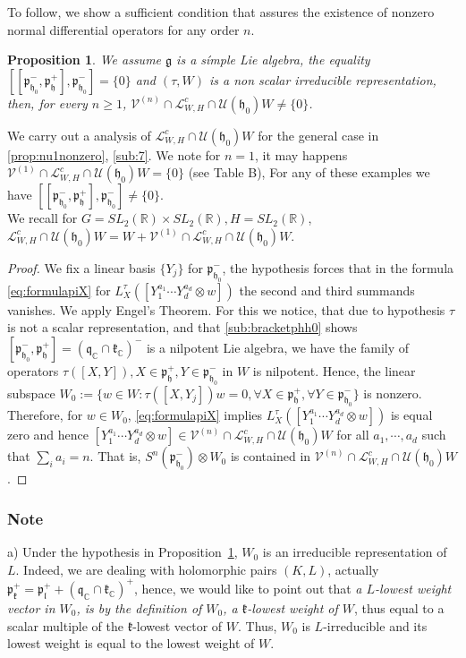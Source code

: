 \documentclass[12pt]{amsart}
\newtheorem{prop}[thm]{Proposition}
\theoremstyle{definition}
\theoremstyle{remark}
\newcommand{\g}{\mathfrak{g}}
\newcommand{\h}{\mathfrak{h}}
\renewcommand{\k}{{\mathfrak k}}
\renewcommand{\l}{\mathfrak l}
\newcommand{\p}{\mathfrak p}
\newcommand{\q}{\mathfrak q}
\newcommand{\C}{{\mathbb C}}
\newcommand{\R}{{\mathbb R}}
\numberwithin{equation}{section}
\begin{document}
 To follow, we show a sufficient condition that assures the existence of nonzero normal differential operators for   any order $n$.
\begin{prop}\label{prop:exisnormal} We assume $\g$ is a símple Lie algebra,  the equality $[[\p_{\h_0}^-, \p_\h^+],\p_{\h_0}^- ]=\{0\}$ and  $(\tau,W)$ is  a non scalar irreducible representation, then, for every $n\geq 1$, $\mathcal V^{(n)}\cap \mathcal L_{W,H}^c \cap \mathcal U(\h_0)W \not=\{0\}$.  \end{prop}
We carry out a analysis of $\mathcal L_{W,H}^c \cap \mathcal U(\h_0)W $ for the general case in \ref{prop:nu1nonzero}, \ref{sub:7}. We note  for $n=1$, it may happens $\mathcal V^{(1)}\cap \mathcal L_{W,H}^c \cap \mathcal U(\h_0)W =\{0\}$    (see
Table B), For any of these examples we have    $[[\p_{\h_0}^-, \p_\h^+],\p_{\h_0}^- ]\not=\{0\} $.\\  We recall for $G=SL_2(\R)\times SL_2(\R), H=SL_2(\R)$, $\mathcal L_{W,H}^c \cap \mathcal U(\h_0)W =W+\mathcal V^{(1)}\cap \mathcal L_{W,H}^c \cap \mathcal U(\h_0)W $.

\begin{proof}
We fix a linear basis $\{Y_j\}$ for $\p_{\h_0}^-$, the hypothesis forces that in  the formula \ref{eq:formulapiX} for $L_X^\tau([Y_1^{a_1}\cdots Y_d^{a_d}\otimes w])$ the second and third summands vanishes. We apply Engel's Theorem. For this we notice, that due to hypothesis $\tau$ is not a scalar representation, and that \ref{sub:bracketphh0} shows $[\p_{\h_0}^-, \p_\h^+]=(\q_\C \cap \k_\C)^-$ is a nilpotent Lie algebra, we have the family of operators $\tau([X,Y]), X\in \p_\h^+,  Y \in \p_{\h_0}^-$ in $W$ is nilpotent. Hence,  the  linear subspace
$W_0:=\{w \in W: \tau([X,Y_j])w=0, \forall X\in \p_\h^+, \forall Y \in \p_{\h_0}^-\}$ is nonzero. Therefore, for $w\in W_0$, \ref{eq:formulapiX} implies   $L_X^\tau([Y_1^{a_1}\cdots Y_d^{a_d}\otimes w])$ is equal zero and hence $[Y_1^{a_1}\cdots Y_d^{a_d}\otimes w] \in \mathcal V^{(n)}\cap \mathcal L_{W,H}^c \cap \mathcal U(\h_0)W$ for all $a_1,\cdots, a_d$ such that $\sum_i a_i=n$. That is, $S^n(\p_{\h_0}^- )\otimes W_0 $ is contained in $\mathcal V^{(n)}\cap \mathcal L_{W,H}^c \cap \mathcal U(\h_0)W$. \end{proof}

\subsubsection{Note}\label{sub:w0irred} a) Under the hypothesis in Proposition~\ref{prop:exisnormal}, $W_0$ is an irreducible representation of $L$. Indeed, we are dealing with holomorphic pairs $(K,L)$, actually $\p_\k^+= \p_\l^+ +(\q_\C \cap \k_\C)^+$,  hence, we would like to point out that {\it a $L$-lowest weight vector in $W_0$, is by the definition of $W_0$, a  $\k$-lowest weight   of $W$}, thus equal to a scalar multiple of the $\k$-lowest  vector of $W$. Thus, $W_0$ is $L$-irreducible and its lowest weight is equal to the lowest  weight of $W$.
\end{document}
